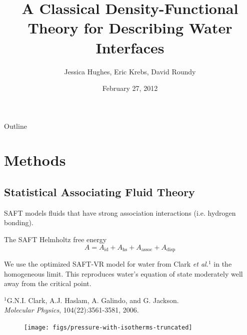 \documentclass[compress]{beamer}
\title{A Classical Density-Functional Theory for Describing Water
  Interfaces}
\author{Jessica Hughes, Eric Krebs, David Roundy}
\date{February 27, 2012}
\begin{document}
\begin{frame}
  \titlepage
\end{frame}

\begin{frame}{Outline}
  \tableofcontents
\end{frame}

\section{Methods}

\subsection{Statistical Associating Fluid Theory}

\begin{frame}{}
  SAFT models fluids that have strong association interactions
  (i.e. hydrogen bonding).

  \begin{block}{The SAFT Helmholtz free energy}
    \begin{equation*}
      A = A_\text{id} + A_\text{hs} + A_\text{assoc} + A_\text{disp}
    \end{equation*}
  \end{block}

  \vfill

  We use the optimized SAFT-VR model for water from Clark \emph{et
    al.}$^1$ in the homogeneous limit.  This reproduces water's
  equation of state moderately well away from the critical point.

  \vfill

  \scriptsize{$^1$G.N.I. Clark, A.J. Haslam, A. Galindo, and 
    G. Jackson.\\ \emph{Molecular Physics}, 104(22):3561-3581, 2006.}
\end{frame}



\begin{frame}[fragile]{}
\begin{figure}
\begin{center}
\texttt{[image: figs/pressure-with-isotherms-truncated]}
\end{center}
\end{figure} 
\end{frame}
\end{document}
